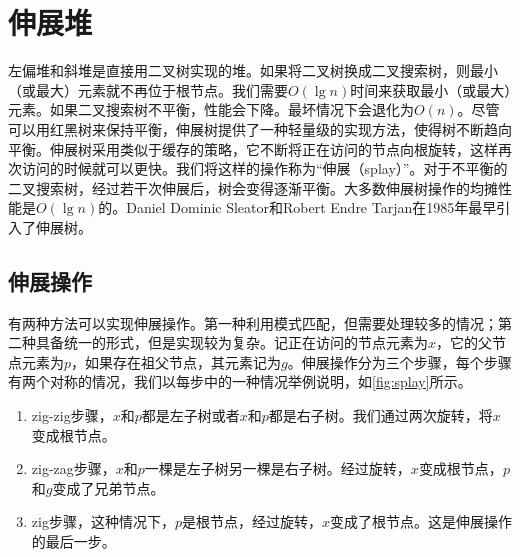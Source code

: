 \documentclass[b5paper]{ctexart}
\begin{document}
\section{伸展堆}
\label{splayheap} 

左偏堆和斜堆是直接用二叉树实现的堆。如果将二叉树换成二叉搜索树，则最小（或最大）元素就不再位于根节点。我们需要$O(\lg n)$时间来获取最小（或最大）元素。如果二叉搜索树不平衡，性能会下降。最坏情况下会退化为$O(n)$。尽管可以用红黑树来保持平衡，伸展树提供了一种轻量级的实现方法，使得树不断趋向平衡。伸展树采用类似于缓存的策略，它不断将正在访问的节点向根旋转，这样再次访问的时候就可以更快。我们将这样的操作称为“伸展（splay）”。对于不平衡的二叉搜索树，经过若干次伸展后，树会变得逐渐平衡。大多数伸展树操作的均摊性能是$O(\lg n)$的。Daniel Dominic Sleator和Robert Endre Tarjan在1985年最早引入了伸展树\cite{wiki-splay-tree}\cite{self-adjusting-trees}。

\subsection{伸展操作}

有两种方法可以实现伸展操作。第一种利用模式匹配，但需要处理较多的情况；第二种具备统一的形式，但是实现较为复杂。记正在访问的节点元素为$x$，它的父节点元素为$p$，如果存在祖父节点，其元素记为$g$。伸展操作分为三个步骤，每个步骤有两个对称的情况，我们以每步中的一种情况举例说明，如\cref{fig:splay}所示。

\begin{enumerate}
\item zig-zig步骤，$x$和$p$都是左子树或者$x$和$p$都是右子树。我们通过两次旋转，将$x$变成根节点。

\item zig-zag步骤，$x$和$p$一棵是左子树另一棵是右子树。经过旋转，$x$变成根节点，$p$和$g$变成了兄弟节点。

\item zig步骤，这种情况下，$p$是根节点，经过旋转，$x$变成了根节点。这是伸展操作的最后一步。
\end{enumerate}
\end{document}
